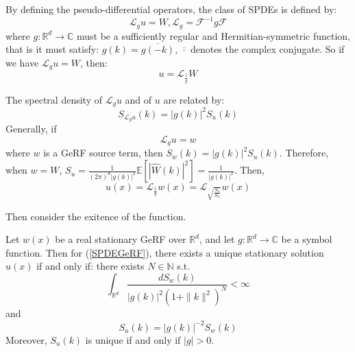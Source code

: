 By defining the pseudo-differential operators, the class of SPDEs is defined by:
\begin{equation}
	\mathcal{L}_gu = W, \mathcal{L}_g = \mathcal{F}^{-1}g\mathcal{F}
\end{equation}
where $g:\mathbb{R}^d\rightarrow \mathbb{C}$ must be a sufficiently regular and Hermitian-symmetric function, that is it must satisfy: $g(k) = \overline{g(-k)}$, $\overline{\cdot}$ denotes the complex conjugate.
So if we have $\mathcal{L}_gu = W$, then:
\begin{equation}
	u=\mathcal{L}_{\frac{1}{g}}W
\end{equation}

\begin{theorem}
	The spectral density of $\mathcal{L}_gu$ and of $u$ are related by:
	\begin{equation}
		S_{\mathcal{L}_gu}(k) = \left|g(k)\right|^2S_u(k)
	\end{equation}
	Generally, if 
	\begin{equation}\label{SPDEGeRF}
		\mathcal{L}_gu = w
	\end{equation}
	where $w$ is a GeRF source term, then $S_w(k) = \left|g(k)\right|^2S_u(k)$.
	Therefore, when $w = W$, $S_u =\frac{1}{(2\pi)^{d}\left|g(k)\right|^2}\mathbb{E}[|\hat{W}(k)|^2]=\frac{1}{\left|g(k)\right|^2}$. 
  Then, 
\begin{equation}
	u(x) =\mathcal{L}_{\frac{1}{g}}w(x) = \mathcal{L}_{\sqrt{\frac{S_u}{S_w}}}w(x)
\end{equation}
\end{theorem}

Then consider the exitence of the function.
\begin{theorem}
	Let $w(x)$ be a real stationary GeRF over $\mathbb{R}^d$, and let $g:\mathbb{R}^d\rightarrow \mathbb{C}$ be a symbol function. 
	Then for (\ref{SPDEGeRF}), there exists a unique stationary solution $u(x)$ if and only if:
	there exists $N\in \mathbb{N}$ s.t. 
	\begin{equation}
		\int_{\mathbb{R}^d}\frac{dS_w(k)}{\left|g(k)\right|^2(1+\|k\|^2)^N} < \infty
	\end{equation}
	and 
	\begin{equation}
		S_u(k) = \left|g(k)\right|^{-2}S_w(k)
	\end{equation}
	Moreover, $S_u(k)$ is unique if and only if $\left|g\right|>0$.
\end{theorem}


